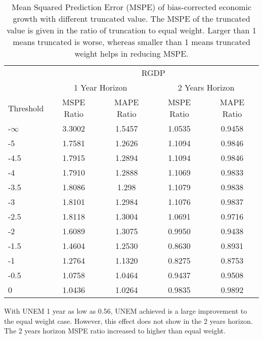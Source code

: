 \documentclass[11pt]{article}
\begin{document}
\begin{table}[!h]
\centering
\caption{Mean Squared Prediction Error (MSPE) of bias-corrected economic growth with different truncated value. The MSPE of the truncated value is given in the ratio of truncation to equal weight. Larger than 1 means truncated is worse, whereas smaller than 1 means truncated weight helps in reducing MSPE.}
\label{tab: MSPE RGDP bias}
\begin{tabular}{lcccc}
	\hline
	                                                &                        \multicolumn{4}{c}{RGDP}                         \\
	\cmidrule(lr){2-5}                              & \multicolumn{2}{c}{1 Year Horizon} & \multicolumn{2}{c}{2 Years Horizon} \\
	\cmidrule(lr){2-3} \cmidrule(lr){4-5}
	Threshold & MSPE Ratio & MAPE Ratio  & MSPE Ratio & MAPE Ratio  \\ \hline
-$\infty$ & 3.3002 & 1.5457 & 1.0535 & 0.9458\\ 
-5 & 1.7581 & 1.2626 & 1.1094 & 0.9846\\ 
-4.5 & 1.7915 & 1.2894 & 1.1094 & 0.9846\\ 
-4 & 1.7910 & 1.2888 & 1.1069 & 0.9833\\ 
-3.5 & 1.8086 & 1.298 & 1.1079 & 0.9838\\ 
-3 & 1.8101 & 1.2984 & 1.1076 & 0.9837\\ 
-2.5 & 1.8118 & 1.3004 & 1.0691 & 0.9716\\ 
-2 & 1.6089 & 1.3075 & 0.9950 & 0.9438\\ 
-1.5 & 1.4604 & 1.2530 & 0.8630 & 0.8931\\ 
-1 & 1.2764 & 1.1320 & 0.8275 & 0.8753\\ 
-0.5 & 1.0758 & 1.0464 & 0.9437 & 0.9508\\ 
0 & 1.0436 & 1.0264 & 0.9835 & 0.9892\\ \hline
\end{tabular}
\end{table}


With UNEM 1 year as low as 0.56, UNEM achieved is a large improvement to the equal weight case. However, this effect does not show in the 2 years horizon. The 2 years horizon MSPE ratio increased to higher than equal weight.
\end{document}
